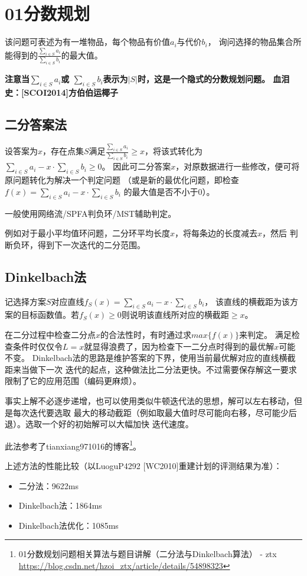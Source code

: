 \section{01分数规划}
该问题可表述为有一堆物品，每个物品有价值$a_i$与代价$b_i$，
询问选择的物品集合所能得到的$\frac{\displaystyle \sum_{i\in S}{a_i}}
	{\displaystyle \sum_{i\in S}{b_i}}$的最大值。

{\bfseries 注意当$\displaystyle \sum_{i\in S}{a_i}$或
$\displaystyle \sum_{i\in S}{b_i}$表示为$|S|$时，这是一个隐式的分数规划问题。
血泪史：[SCOI2014]方伯伯运椰子}

\subsection{二分答案法}

设答案为$x$，存在点集$S$满足$\frac{\displaystyle \sum_{i\in S}{a_i}}
	{\displaystyle \sum_{i\in S}{b_i}}\geq x$，将该式转化为
$\displaystyle \sum_{i\in S}{a_i}-x\cdot \sum_{i\in S}{b_i}\geq 0$。
因此可二分答案$x$，对原数据进行一些修改，便可将原问题转化为解决一个判定问题
（或是新的最优化问题，即检查
$\displaystyle f(x)=\sum_{i\in S}{a_i}-x\cdot \sum_{i\in S}{b_i}$
的最大值是否不小于0）。

一般使用网络流/SPFA判负环/MST辅助判定。

例如对于最小平均值环问题，二分环平均长度$x$，将每条边的长度减去$x$，然后
判断负环，得到下一次迭代的二分范围。

\subsection{Dinkelbach法}
记选择方案$S$对应直线$f_S(x)=\sum_{i\in S}{a_i}-x\cdot \sum_{i\in S}{b_i}$，
该直线的横截距为该方案的目标函数值。若$f_S(x)\geq 0$则说明该直线所对应的横截距$\geq x$。

在二分过程中检查二分点$x$的合法性时，有时通过求$max\{f(x)\}$来判定。
满足检查条件时仅仅令$L=x$就显得浪费了，因为检查下一二分点时得到的最优解$x$可能不变。
Dinkelbach法的思路是维护答案的下界，使用当前最优解对应的直线横截距来当做下一次
迭代的起点，这种做法比二分法更快。不过需要保存解这一要求限制了它的应用范围（编码更麻烦）。

事实上解不必逐步递增，也可以使用类似牛顿迭代法的思想，解可以左右移动，但是每次迭代要选取
最大的移动截距（例如取最大值时尽可能向右移，尽可能少后退）。选取一个好的初始解可以大幅加快
迭代速度。

此法参考了tianxiang971016的博客\footnote{
	01分数规划问题相关算法与题目讲解（二分法与Dinkelbach算法） - ztx
	\url{https://blog.csdn.net/hzoi\_ztx/article/details/54898323}
}。

上述方法的性能比较（以LuoguP4292 [WC2010]重建计划的评测结果为准）：
\begin{itemize}
	\item 二分法：9622ms
	\item Dinkelbach法：1864ms
	\item Dinkelbach法优化：1085ms
\end{itemize}

